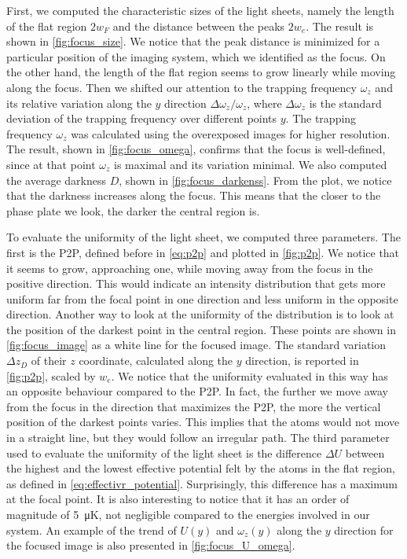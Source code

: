 First, we computed the characteristic sizes of the light sheets, namely the length of the flat region $2w_F$ and the distance between the peaks $2w_e$. The result is shown in \cref{fig:focus_size}. We notice that the peak distance is minimized for a particular position of the imaging system, which we identified as the focus. On the other hand, the length of the flat region seems to grow linearly while moving along the focus. Then we shifted our attention to the trapping frequency $\omega_z$ and its relative variation along the $y$ direction $\Delta \omega_z/\omega_z$, where $\Delta \omega_z$ is the standard deviation of the trapping frequency over different points $y$. The trapping frequency $\omega_z$ was calculated using the overexposed images for higher resolution. The result, shown in \cref{fig:focus_omega}, confirms that the focus is well-defined, since at that point $\omega_z$ is maximal and its variation minimal. We also computed the average darkness $D$, shown in \cref{fig:focus_darkenss}. From the plot, we notice that the darkness increases along the focus. This means that the closer to the phase plate we look, the darker the central region is.

To evaluate the uniformity of the light sheet, we computed three parameters. The first is the P2P, defined before in \cref{eq:p2p} and plotted in \cref{fig:p2p}. We notice that it seems to grow, approaching one, while moving away from the focus in the positive direction. This would indicate an intensity distribution that gets more uniform far from the focal point in one direction and less uniform in the opposite direction. Another way to look at the uniformity of the distribution is to look at the position of the darkest point in the central region. These points are shown in \cref{fig:focus_image} as a white line for the focused image. The standard variation $\Delta z_D$ of their $z$ coordinate, calculated along the $y$ direction, is reported in \cref{fig:p2p}, scaled by $w_e$. We notice that the uniformity evaluated in this way has an opposite behaviour compared to the P2P. In fact, the further we move away from the focus in the direction that maximizes the P2P, the more the vertical position of the darkest points varies. This implies that the atoms would not move in a straight line, but they would follow an irregular path. The third parameter used to evaluate the uniformity of the light sheet is the difference $\Delta U$ between the highest and the lowest effective potential felt by the atoms in the flat region, as defined in \cref{eq:effectivr_potential}. Surprisingly, this difference has a maximum at the focal point. It is also interesting to notice that it has an order of magnitude of \SI{5}{\micro K}, not negligible compared to the energies involved in our system. An example of the trend of $U(y)$ and $\omega_z(y)$ along the $y$ direction for the focused image is also presented in \cref{fig:focus_U_omega}.


